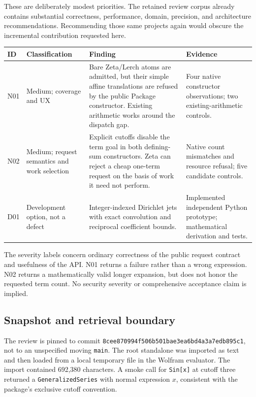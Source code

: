 \documentclass[11pt,letterpaper]{article}
\newcommand{\code}[1]{\nolinkurl{#1}}
\newcommand{\rev}{8cee870994f506b501bae3ea6bd4a3a7edb895c1}
\begin{document}
These are deliberately modest priorities. The retained review corpus already
contains substantial correctness, performance, domain, precision, and
architecture recommendations. Recommending those same projects again would
obscure the incremental contribution requested here.~\cite{reviewindex,register}

\begin{longtable}{@{}P{0.07\textwidth}P{0.15\textwidth}P{0.49\textwidth}P{0.22\textwidth}@{}}
\toprule
ID & Classification & Finding & Evidence\\\midrule\endhead
N01 & Medium; coverage and UX & Bare Zeta/Lerch atoms are admitted, but their simple affine translations are refused by the public Package constructor. Existing arithmetic works around the dispatch gap. & Four native constructor observations; two existing-arithmetic controls.\\
N02 & Medium; request semantics and work selection & Explicit cutoffs disable the term goal in both defining-sum constructors. Zeta can reject a cheap one-term request on the basis of work it need not perform. & Native count mismatches and resource refusal; five candidate controls.\\
D01 & Development option, not a defect & Integer-indexed Dirichlet jets with exact convolution and reciprocal coefficient bounds. & Implemented independent Python prototype; mathematical derivation and tests.\\
\bottomrule
\end{longtable}

The severity labels concern ordinary correctness of the public request contract
and usefulness of the API. N01 returns a failure rather than a wrong expression.
N02 returns a mathematically valid longer expansion, but does not honor the
requested term count. No security severity or comprehensive acceptance claim
is implied.

\subsection{Snapshot and retrieval boundary}
The review is pinned to commit \texttt{\rev}, not to an unspecified moving
\code{main}. The root standalone was imported as text and then loaded from a
local temporary file in the Wolfram evaluator. The import contained 692,380
characters. A smoke call for \code{Sin[x]} at cutoff three returned a
\code{GeneralizedSeries} with normal expression $x$, consistent with the
package's exclusive cutoff convention.~\cite{core}
\end{document}
